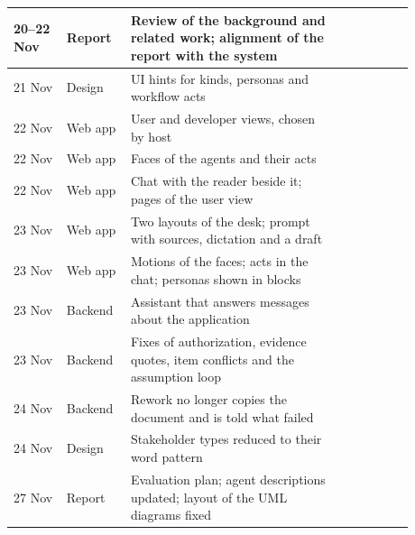 \begin{appendices}
\begin{longtable}{|p{0.12\linewidth}|p{0.12\linewidth}|p{0.48\linewidth}|p{0.16\linewidth}|}
    20--22 Nov & Report & Review of the background and related work; alignment of the report with the system & \\ \hline
    21 Nov & Design & UI hints for kinds, personas and workflow acts & \\ \hline
    22 Nov & Web app & User and developer views, chosen by host & \\ \hline
    22 Nov & Web app & Faces of the agents and their acts & \\ \hline
    22 Nov & Web app & Chat with the reader beside it; pages of the user view & \\ \hline
    23 Nov & Web app & Two layouts of the desk; prompt with sources, dictation and a draft & \\ \hline
    23 Nov & Web app & Motions of the faces; acts in the chat; personas shown in blocks & \\ \hline
    23 Nov & Backend & Assistant that answers messages about the application & \\ \hline
    23 Nov & Backend & Fixes of authorization, evidence quotes, item conflicts and the assumption loop & \\ \hline
    24 Nov & Backend & Rework no longer copies the document and is told what failed & \\ \hline
    24 Nov & Design & Stakeholder types reduced to their word pattern & \\ \hline
    27 Nov & Report & Evaluation plan; agent descriptions updated; layout of the UML diagrams fixed & \\ \hline
\end{longtable}
\endgroup

\end{appendices}
